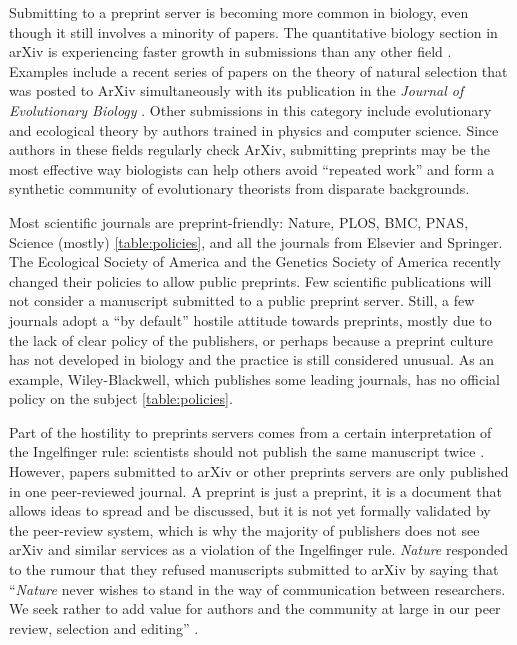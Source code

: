 \documentclass[letterpaper,twocolumn,superscriptaddress,showkeys]{revtex4}
\begin{document}
Submitting to a preprint server is becoming more common in biology,
even though it still involves a minority of papers. The quantitative
biology section in arXiv is experiencing faster growth in submissions
than any other field \cite{cal12}.  Examples include a recent series
of papers on the theory of natural selection that was posted to ArXiv
simultaneously with its publication in the \emph{Journal of
  Evolutionary Biology}
\cite{JEB:JEB2431,JEB:JEB2498,JEB:JEB2378,JEB:JEB2373}.  Other
submissions in this category include evolutionary and ecological
theory by authors trained in physics and computer science.  Since
authors in these fields regularly check ArXiv, submitting preprints
may be the most effective way biologists can help others avoid
``repeated work'' \cite{de2011contribution} and form a synthetic
community of evolutionary theorists from disparate backgrounds.

Most scientific journals are preprint-friendly: Nature, PLOS, BMC,
PNAS, Science (mostly) \ref{table:policies}, and all the journals from
Elsevier and Springer.  The Ecological Society of America and the
Genetics Society of America recently changed their policies to allow
public preprints.  Few scientific publications will not consider a
manuscript submitted to a public preprint server.  Still, a few
journals adopt a ``by default'' hostile attitude towards preprints,
mostly due to the lack of clear policy of the publishers, or perhaps
because a preprint culture has not developed in biology and the
practice is still considered unusual. As an example, Wiley-Blackwell,
which publishes some leading journals, has no official policy on the
subject \ref{table:policies}.

Part of the hostility to preprints servers comes from a certain
interpretation of the Ingelfinger rule: scientists should not publish
the same manuscript twice \cite{alt96}. However, papers submitted to
arXiv or other preprints servers are only published in one
peer-reviewed journal. A preprint is just a preprint, it is a document
that allows ideas to spread and be discussed, but it is not yet
formally validated by the peer-review system, which is why the
majority of publishers does not see arXiv and similar services as a
violation of the Ingelfinger rule. \emph{Nature} responded to the
rumour that they refused manuscripts submitted to arXiv by saying that
``\emph{Nature} never wishes to stand in the way of communication
between researchers. We seek rather to add value for authors and the
community at large in our peer review, selection and editing''
\cite{nat05}.
\end{document}
